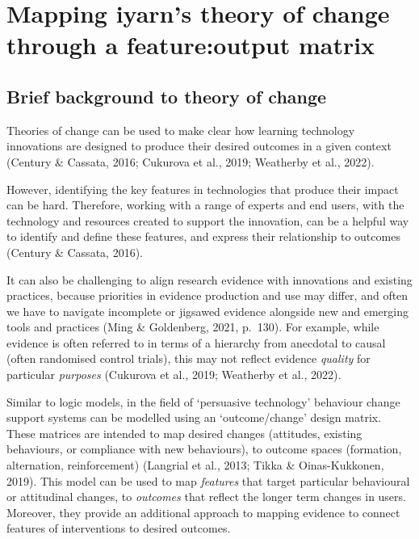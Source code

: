 \documentclass[
]{book}
\begin{document}
\hypertarget{model}{%
\chapter{Mapping iyarn's theory of change through a feature:output matrix}\label{model}}

\hypertarget{brief-background-to-theory-of-change}{%
\section{Brief background to theory of change}\label{brief-background-to-theory-of-change}}

Theories of change can be used to make clear how learning technology
innovations are designed to produce their desired outcomes in a given
context (Century \& Cassata, 2016; Cukurova et al., 2019; Weatherby et
al., 2022).

However, identifying the key features in technologies that produce their
impact can be hard. Therefore, working with a range of experts and end
users, with the technology and resources created to support the
innovation, can be a helpful way to identify and define these features,
and express their relationship to outcomes (Century \& Cassata, 2016).

It can also be challenging to align research evidence with innovations
and existing practices, because priorities in evidence production and
use may differ, and often we have to navigate incomplete or jigsawed
evidence alongside new and emerging tools and practices (Ming \&
Goldenberg, 2021, p.~130). For example, while evidence is often referred
to in terms of a hierarchy from anecdotal to causal (often randomised
control trials), this may not reflect evidence \emph{quality} for particular
\emph{purposes} (Cukurova et al., 2019; Weatherby et al., 2022)\emph{.}

Similar to logic models, in the field of `persuasive technology'
behaviour change support systems can be modelled using an
`outcome/change' design matrix. These matrices are intended to map
desired changes (attitudes, existing behaviours, or compliance with new
behaviours), to outcome spaces (formation, alternation, reinforcement)
(Langrial et al., 2013; Tikka \& Oinas-Kukkonen, 2019). This model can be
used to map \emph{features} that target particular behavioural or attitudinal
changes, to \emph{outcomes} that reflect the longer term changes in users.
Moreover, they provide an additional approach to mapping evidence to
connect features of interventions to desired outcomes.
\end{document}

